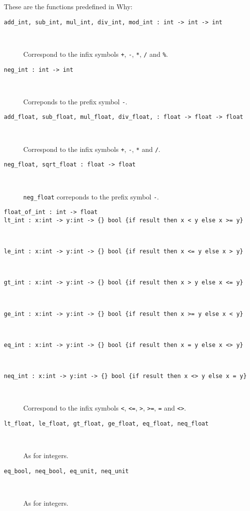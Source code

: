 \documentclass[a4paper,12pt]{report}
\newcommand{\why}{\textsf{Why}}
\begin{document}
These are the functions predefined in \why:
\begin{description}
\item[\texttt{add\_int, sub\_int, mul\_int, div\_int, mod\_int : int
    -> int -> int}] ~\par
  Correspond to the infix symbols
  \texttt{+}, \texttt{-}, \texttt{*}, \texttt{/} and \texttt{\%}.

\item[\texttt{neg\_int : int -> int}] ~\par
  Correponds to the prefix symbol \texttt{-}.

\item[\texttt{add\_float, sub\_float, mul\_float, div\_float,
    : float -> float -> float}] ~\par
  Correspond to the infix symbols
  \texttt{+}, \texttt{-}, \texttt{*} and \texttt{/}.

\item[\texttt{neg\_float, sqrt\_float : float -> float}] ~\par
  \texttt{neg\_float} correponds to the prefix symbol \texttt{-}.

\item[\texttt{float\_of\_int : int -> float}]

\item[\texttt{lt\_int : x:int -> y:int -> \{\} bool \{if result then x
    < y else x >= y\}}] ~\par
\item[\texttt{le\_int : x:int -> y:int -> \{\} bool \{if result then x
    <= y else x > y\}}] ~\par
\item[\texttt{gt\_int : x:int -> y:int -> \{\} bool \{if result then x
    > y else x <= y\}}] ~\par
\item[\texttt{ge\_int : x:int -> y:int -> \{\} bool \{if result then x
    >= y else x < y\}}] ~\par
\item[\texttt{eq\_int : x:int -> y:int -> \{\} bool \{if result then x
    = y else x <> y\}}] ~\par
\item[\texttt{neq\_int : x:int -> y:int -> \{\} bool \{if result then x
    <> y else x = y\}}] ~\par
  Correspond to the infix symbols \texttt{<}, \texttt{<=}, \texttt{>},
  \texttt{>=}, \texttt{=} and \texttt{<>}.

\item[\texttt{lt\_float, le\_float, gt\_float, ge\_float, eq\_float,
    neq\_float}] ~\par
  As for integers.

\item[\texttt{eq\_bool, neq\_bool, eq\_unit, neq\_unit}] ~\par
  As for integers.

\end{description}
\end{document}
